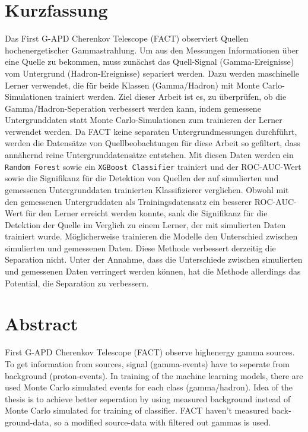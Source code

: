 \thispagestyle{plain}

\section*{Kurzfassung}
Das First G-APD Cherenkov Telescope (FACT) observiert Quellen hochenergetischer Gammastrahlung.
Um aus den Messungen Informationen über eine Quelle zu bekommen, muss zunächst das Quell-Signal (Gamma-Ereignisse) vom Untergrund (Hadron-Ereignisse) separiert werden.
Dazu werden maschinelle Lerner verwendet, die für beide Klassen (Gamma/Hadron) mit Monte Carlo-Simulationen trainiert werden.
Ziel dieser Arbeit ist es, zu überprüfen, ob die Gamma/Hadron-Seperation verbessert werden kann, indem gemessene Untergrunddaten statt Monte Carlo-Simulationen zum trainieren der Lerner verwendet werden.
Da FACT keine separaten Untergrundmessungen durchführt, werden die Datensätze von Quellbeobachtungen für diese Arbeit so gefiltert, dass annähernd reine Untergrunddatensätze entstehen.
Mit diesen Daten werden ein \texttt{Random Forest} sowie ein \texttt{XGBoost Classifier} trainiert und der ROC-AUC-Wert sowie die Signifikanz für die Detektion von Quellen der auf simulierten und gemessenen Untergrunddaten trainierten Klassifizierer verglichen. 
Obwohl mit den gemessenen Untergruddaten als Trainingsdatensatz ein besserer ROC-AUC-Wert für den Lerner erreicht werden konnte, sank die Signifikanz für die Detektion der Quelle im Verglich zu einem Lerner, der mit simulierten Daten trainiert wurde. 
Möglicherweise trainieren die Modelle den Unterschied zwischen simulierten und gemessenen Daten. 
Diese Methode verbessert derzeitig die Separation nicht. 
Unter der Annahme, dass die Unterschiede zwischen simulierten und gemessenen Daten verringert werden können, hat die Methode allerdings das Potential, die Separation zu verbessern. 
\section*{Abstract}
\begin{english}
First G-APD Cherenkov Telescope (FACT) observe highenergy gamma sources.
To get information from sources, signal (gamma-events) have to seperate from background (proton-events). 
In training of the machine learning models, there are used Monte Carlo simulated events for each class (gamma/hadron).
Idea of the thesis is to achieve better seperation by using measured background instead of Monte Carlo simulated for training of classifier.
FACT haven't measured background-data, so a modified source-data with filtered out gammas is used.
\end{english}
